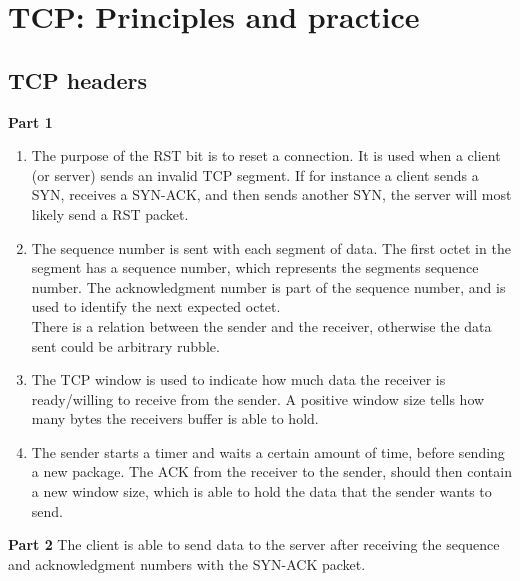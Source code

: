 \section{TCP: Principles and practice}
\subsection{TCP headers}
\textbf{Part 1}\\
\begin{enumerate}
\item The purpose of the RST bit is to reset a connection. It is used
  when a client (or server) sends an invalid TCP segment. If for instance a
  client sends a SYN, receives a SYN-ACK, and then sends another SYN, the server
  will most likely send a RST packet.
\item The sequence number is sent with each segment of data. The first octet in
  the segment has a sequence number, which represents the segments sequence
  number. The acknowledgment number is part of the sequence number, and is used
  to identify the next expected octet.\\
  There is a relation between the sender and the receiver, otherwise the data
  sent could be arbitrary rubble.
\item The TCP window is used to indicate how much data the receiver is
  ready/willing to receive from the sender. A positive window size tells how
  many bytes the receivers buffer is able to hold.
\item The sender starts a timer and waits a certain amount of time, before
  sending a new package. The ACK from the receiver to the sender, should then
  contain a new window size, which is able to hold the data that the sender
  wants to send.
\end{enumerate}

\noindent \textbf{Part 2}
The client is able to send data to the server after receiving the sequence and
acknowledgment numbers with the SYN-ACK packet.\\

